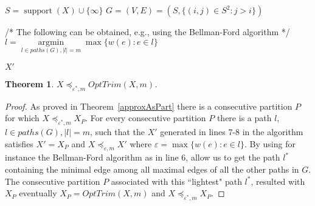 \documentclass[review]{elsarticle}
\newtheorem{theorem}{Theorem}
\DeclareMathOperator{\support}{support}
\begin{document}
%
%  
%     


\begin{algorithm}
	\DontPrintSemicolon
	$S = \support(X)\cup \{\infty\}$\;
	$G=(V,E)=(S, \{ (i,j) \in S^2 \colon  j>i \})$ \;
	

	/* The following can be obtained, e.g., using the Bellman-Ford algorithm */\;
	$l= \operatorname{argmin}\limits_{l \in paths(G),|l|=m}  \max \{ w(e)\colon e \in l  \}$ \;
	

	\Return $X'$\;
	
	\caption{$OptTrim (X, m)$}  
	\label{alg:sequence}
\end{algorithm}


\begin{theorem}
$X \preceq_{\varepsilon^*,m} OptTrim(X,m)$.
\end{theorem}

\begin{proof}
As proved in Theorem~\ref{approxAsPart} there is a consecutive partition $P$ for which $X \preceq_{\varepsilon^*,m} X_P$.
For every consecutive partition $P$ there is a path $l$, $l\in paths(G), |l|=m$, such that the $X'$ generated in lines 7-8 in the algorithm satisfies $X' = X_P$ and  $X\preceq_{\varepsilon,m} X'$ where $\varepsilon = \max \{ w(e)\colon e \in l  \}$. By using for instance the Bellman-Ford algorithm as in line 6, allow us to get the path $l^*$ containing the minimal edge among all maximal edges of all the other paths in $G$. The consecutive partition $P$ associated with this ``lightest" path $l^*$, resulted with $X_P$ eventually $X_P = OptTrim(X,m)$ and  $X \preceq_{\varepsilon^*,m} X_P$.
\end{proof}
\end{document}
